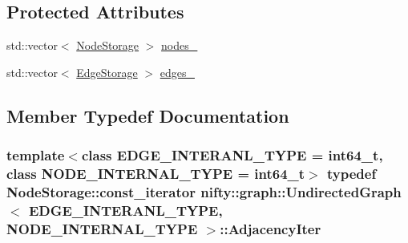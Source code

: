 \subsection*{Protected Attributes}
\begin{DoxyCompactItemize}
\item 
std\+::vector$<$ \hyperlink{classnifty_1_1graph_1_1UndirectedGraph_a3a90ae1386fcc168216856934bf1ec24}{Node\+Storage} $>$ \hyperlink{classnifty_1_1graph_1_1UndirectedGraph_a4e12e37bede71b7beaca9fdbc7dd9abc}{nodes\+\_\+}
\item 
std\+::vector$<$ \hyperlink{classnifty_1_1graph_1_1UndirectedGraph_a77256cc943f931180bf84b14d943f39a}{Edge\+Storage} $>$ \hyperlink{classnifty_1_1graph_1_1UndirectedGraph_adc3e4d3dc0f8bff661042af2a05d342f}{edges\+\_\+}
\end{DoxyCompactItemize}


\subsection{Member Typedef Documentation}
\hypertarget{classnifty_1_1graph_1_1UndirectedGraph_adecb4597d23d097b08c2c03a106bc57b}{}
\subsubsection[{Adjacency\+Iter}]{\setlength{\rightskip}{0pt plus 5cm}template$<$class E\+D\+G\+E\+\_\+\+I\+N\+T\+E\+R\+A\+N\+L\+\_\+\+T\+Y\+P\+E = int64\+\_\+t, class N\+O\+D\+E\+\_\+\+I\+N\+T\+E\+R\+N\+A\+L\+\_\+\+T\+Y\+P\+E = int64\+\_\+t$>$ typedef {\bf Node\+Storage\+::const\+\_\+iterator} {\bf nifty\+::graph\+::\+Undirected\+Graph}$<$ E\+D\+G\+E\+\_\+\+I\+N\+T\+E\+R\+A\+N\+L\+\_\+\+T\+Y\+P\+E, N\+O\+D\+E\+\_\+\+I\+N\+T\+E\+R\+N\+A\+L\+\_\+\+T\+Y\+P\+E $>$\+::{\bf Adjacency\+Iter}}\label{classnifty_1_1graph_1_1UndirectedGraph_adecb4597d23d097b08c2c03a106bc57b}
\hypertarget{classnifty_1_1graph_1_1UndirectedGraph_a2f74e8de961bf80dc037ceedf58c46a4}{}
